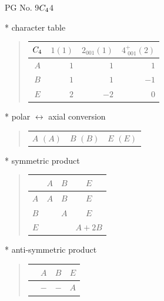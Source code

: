 \documentclass[fleqn,8pt,landscape]{jsarticle}
\begin{document}
\setcounter{MaxMatrixCols}{32}

\renewcommand{\tablename}{Table~}
\renewcommand{\figurename}{Figure~}
\begin{center}
\LARGE
PG No. 9\quad$C_{\rm 4}$\quad$4$\quad[ tetragonal ]
\end{center}

* character table
\begin{quote}
\begin{tabular}{crrr} \hline \hline
$ C_{\rm 4} $ & $ 1(1) $ & $ 2{}_{001}(1) $ & $ 4^{+}_{\,\,001}(2) $ \\ \hline
$ A $ & $ 1 $ & $ 1 $ & $ 1 $ \\
$ B $ & $ 1 $ & $ 1 $ & $ -1 $ \\
$ E $ & $ 2 $ & $ -2 $ & $ 0 $ \\
 \hline \hline
\end{tabular}
\end{quote}

* polar $\leftrightarrow$ axial conversion
\begin{quote}
\begin{tabular}{ccc}
$ A\,\,(A) $ & $ B\,\,(B) $ & $ E\,\,(E) $
\end{tabular}
\end{quote}

* symmetric product
\begin{quote}
\begin{tabular}{c|ccc} \hline \hline
 & $ A $ & $ B $ & $ E $ \\ \hline
$ A $ & $ A $ & $ B $ & $ E $ \\
$ B $ & $  $ & $ A $ & $ E $ \\
$ E $ & $  $ & $  $ & $ A + 2 B $ \\
 \hline \hline
\end{tabular}
\end{quote}

* anti-symmetric product
\begin{quote}
\begin{tabular}{cccc} \hline \hline
 & $ A $ & $ B $ & $ E $ \\ \hline
$  $ & $ - $ & $ - $ & $ A $ \\
 \hline \hline
\end{tabular}
\end{quote}
\end{document}
